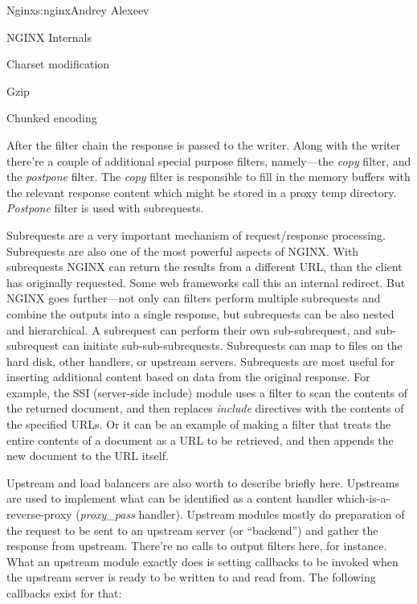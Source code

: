 \begin{aosachapter}{Nginx}{s:nginx}{Andrey Alexeev}
\begin{aosasect1}{NGINX Internals}
\begin{aosaitemize}
\item Charset modification

\item Gzip

\item Chunked encoding

\end{aosaitemize}

After the filter chain the response is passed to the writer. Along
with the writer there're a couple of additional special purpose
filters, namely---the \emph{copy} filter, and the \emph{postpone}
filter. The \emph{copy} filter is responsible to fill in the memory
buffers with the relevant response content which might be stored in a
proxy temp directory. \emph{Postpone} filter is used with subrequests.

Subrequests are a very important mechanism of request/response
processing. Subrequests are also one of the most powerful aspects of
NGINX. With subrequests NGINX can return the results from a different
URL, than the client has originally requested. Some web frameworks
call this an internal redirect. But NGINX goes further---not only can
filters perform multiple subrequests and combine the outputs into a
single response, but subrequests can be also nested and
hierarchical. A subrequest can perform their own sub-subrequest, and
sub-subrequest can initiate sub-sub-subrequests. Subrequests can map
to files on the hard disk, other handlers, or upstream
servers. Subrequests are most useful for inserting additional content
based on data from the original response. For example, the SSI
(server-side include) module uses a filter to scan the contents of the
returned document, and then replaces \emph{include} directives with
the contents of the specified URLs. Or it can be an example of making
a filter that treats the entire contents of a document as a URL to be
retrieved, and then appends the new document to the URL itself.

Upstream and load balancers are also worth to describe briefly
here. Upstreams are used to implement what can be identified as a
content handler which-is-a-reverse-proxy (\emph{proxy\_pass}
handler). Upstream modules mostly do preparation of the request to be
sent to an upstream server (or ``backend'') and gather the response
from upstream. There're no calls to output filters here, for
instance. What an upstream module exactly does is setting callbacks to
be invoked when the upstream server is ready to be written to and read
from. The following callbacks exist for that:


\end{aosasect1}
\end{aosachapter}
